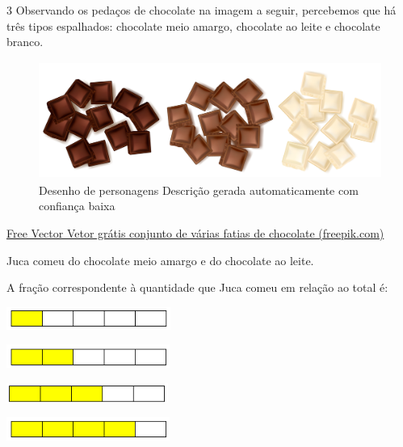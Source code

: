 {{\num{3} Observando os pedaços de chocolate na imagem a seguir, percebemos 
que há três tipos espalhados: chocolate meio amargo, chocolate ao leite e
chocolate branco. 

\begin{figure}
\centering
\includegraphics[width=4.54097in,height=1.51544in]{./_SAEB_9_MAT/media/image53.png}
\caption{Desenho de personagens Descrição gerada automaticamente com
confiança baixa}
\end{figure}

\href{https://br.freepik.com/vetores-gratis/conjunto-de-varias-fatias-de-chocolate_10155086.htm\#page=2\&query=chocolate\&position=49\&from_view=search\&track=sph}{Free
Vector \textbar{} Vetor grátis conjunto de várias fatias de chocolate
(freepik.com)}

Juca comeu  do chocolate meio amargo e  do
chocolate ao leite.

A fração correspondente à quantidade que Juca comeu em relação ao total
é:

\begin{escolha}

\item
  \includegraphics[width=2.11685in,height=0.29169in]{./_SAEB_9_MAT/media/image54.png}
\item
  \includegraphics[width=2.10852in,height=0.30003in]{./_SAEB_9_MAT/media/image55.png}
\item
  \includegraphics[width=2.08351in,height=0.25002in]{./_SAEB_9_MAT/media/image56.png}
\item
  \includegraphics[width=2.10852in,height=0.30003in]{./_SAEB_9_MAT/media/image57.png}
\end{escolha}

}}
